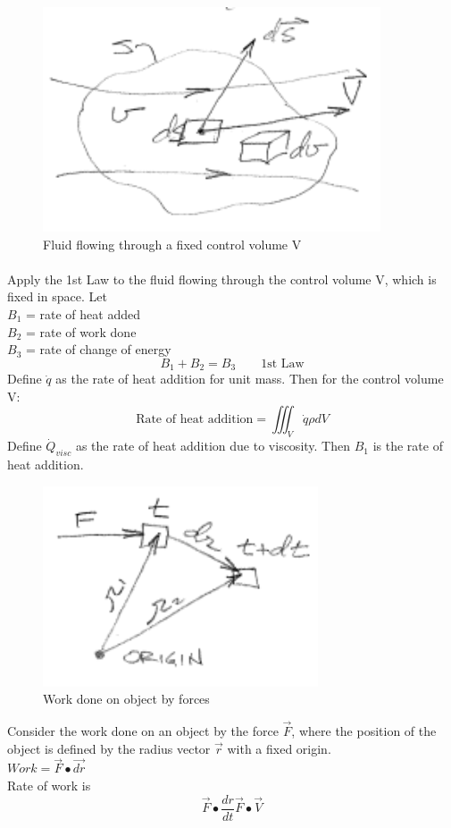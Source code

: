 \documentclass[draft=false, titlepage]{article}
\newcommand{\volumeint}{\iiint_V}
\begin{document}
\begin{figure}
    \centering
    \includegraphics[width=0.4\linewidth]{Figures/pg28_1.PNG}
    \caption{Fluid flowing through a fixed control volume V}
    \label{fig:28_1}
\end{figure}

\paragraph*{} Apply the 1st Law to the fluid flowing through the control volume V, which is fixed in space. Let\\
$B_1$ = rate of heat added\\
$B_2$ = rate of work done\\
$B_3$ = rate of change of energy
\begin{equation*}
    B_1 + B_2 = B_3\qquad \text{1st Law}
\end{equation*}
Define $\dot{q}$ as the rate of heat addition for unit mass. Then for the control volume V:
\begin{equation*}
    \text{Rate of heat addition} = \volumeint\dot{q} \rho dV
\end{equation*}
Define $\dot{Q}_{visc}$ as the rate of heat addition due to viscosity. Then $B_1$ is the rate of heat addition.

\begin{figure}
    \centering
    \includegraphics[width=0.3\linewidth]{Figures/pg29_1.PNG}
    \caption{Work done on object by forces}
    \label{fig:29_1}
\end{figure}

Consider the work done on an object by the force $\vec{F}$, where the position of the object is defined by the radius vector $\vec{r}$ with a fixed origin.\\
$Work = \vec{F} \bullet\vec{dr}$\\
Rate of work is
\begin{equation*}
    \vec{F}\bullet\frac{dr}{dt} \vec{F} \bullet\vec{V}
\end{equation*}
\end{document}
